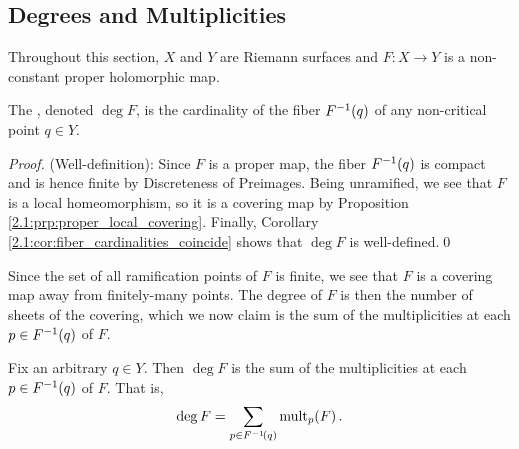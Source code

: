 \documentclass[../Moduli_Spaces_of_Riemann_Surfaces.tex]{subfiles}
\begin{document}
    \subsection{Degrees and Multiplicities}
    Throughout this section, $X$ and $Y$ are Riemann surfaces and $F:X\to Y$ is a non-constant proper holomorphic map.
    \begin{definition}
        The , denoted $\deg F$, is the cardinality of the fiber $F^{-1}\!\left(q\right)$ of any non-critical point $q\in Y$.
    \end{definition}
    \begin{proof}
        (Well-definition): Since $F$ is a proper map, the fiber $F^{-1}\!\left(q\right)$ is compact and is hence finite by Discreteness of Preimages. Being unramified, we see that $F$ is a local homeomorphism, so it is a covering map by Proposition \ref{2.1:prp:proper_local_covering}. Finally, Corollary \ref{2.1:cor:fiber_cardinalities_coincide} shows that $\deg F$ is well-defined.\qed
    \end{proof}
    \begin{remark}
        Since the set of all ramification points of $F$ is finite, we see that $F$ is a covering map away from finitely-many points. The degree of $F$ is then the number of sheets of the covering, which we now claim is the sum of the multiplicities at each $p\in F^{-1}\!\left(q\right)$ of $F$.\exqed
    \end{remark}
    \begin{theorem}
        Fix an arbitrary $q\in Y$. Then $\deg F$ is the sum of the multiplicities at each $p\in F^{-1}\!\left(q\right)$ of $F$. That is,
        \begin{equation*}
            \deg F=\sum_{p\in F^{-1}\!\left(q\right)}\operatorname{mult}_p\!\left(F\right).
        \end{equation*}
    \end{theorem}
\end{document}
